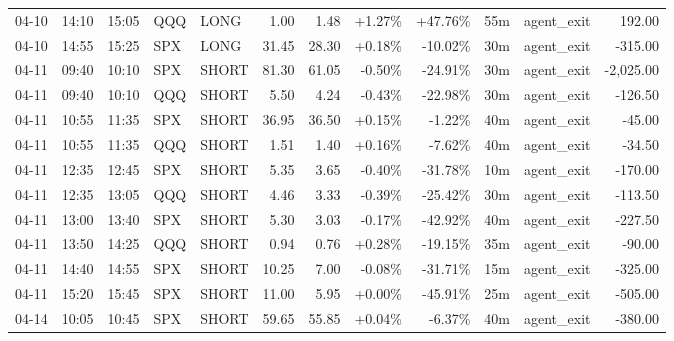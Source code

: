 \documentclass[11pt,a4paper,twoside]{article}
\begin{document}
\begin{center}
\begin{longtable}{>{\color{txtmain}}l l l l l r r r r r >{\color{txtmain}}l r}
04-10 & 14:10 & 15:05 & QQQ & LONG & 1.00 & 1.48 & \textcolor{wingreen}{+1.27\%} & \textcolor{wingreen}{+47.76\%} & 55m & agent\_exit & \textcolor{wingreen}{192.00} \\
04-10 & 14:55 & 15:25 & SPX & LONG & 31.45 & 28.30 & \textcolor{wingreen}{+0.18\%} & \textcolor{lossred}{-10.02\%} & 30m & agent\_exit & \textcolor{lossred}{-315.00} \\
04-11 & 09:40 & 10:10 & SPX & SHORT & 81.30 & 61.05 & \textcolor{lossred}{-0.50\%} & \textcolor{lossred}{-24.91\%} & 30m & agent\_exit & \textcolor{lossred}{-2,025.00} \\
04-11 & 09:40 & 10:10 & QQQ & SHORT & 5.50 & 4.24 & \textcolor{lossred}{-0.43\%} & \textcolor{lossred}{-22.98\%} & 30m & agent\_exit & \textcolor{lossred}{-126.50} \\
04-11 & 10:55 & 11:35 & SPX & SHORT & 36.95 & 36.50 & \textcolor{wingreen}{+0.15\%} & \textcolor{lossred}{-1.22\%} & 40m & agent\_exit & \textcolor{lossred}{-45.00} \\
04-11 & 10:55 & 11:35 & QQQ & SHORT & 1.51 & 1.40 & \textcolor{wingreen}{+0.16\%} & \textcolor{lossred}{-7.62\%} & 40m & agent\_exit & \textcolor{lossred}{-34.50} \\
04-11 & 12:35 & 12:45 & SPX & SHORT & 5.35 & 3.65 & \textcolor{lossred}{-0.40\%} & \textcolor{lossred}{-31.78\%} & 10m & agent\_exit & \textcolor{lossred}{-170.00} \\
04-11 & 12:35 & 13:05 & QQQ & SHORT & 4.46 & 3.33 & \textcolor{lossred}{-0.39\%} & \textcolor{lossred}{-25.42\%} & 30m & agent\_exit & \textcolor{lossred}{-113.50} \\
04-11 & 13:00 & 13:40 & SPX & SHORT & 5.30 & 3.03 & \textcolor{lossred}{-0.17\%} & \textcolor{lossred}{-42.92\%} & 40m & agent\_exit & \textcolor{lossred}{-227.50} \\
04-11 & 13:50 & 14:25 & QQQ & SHORT & 0.94 & 0.76 & \textcolor{wingreen}{+0.28\%} & \textcolor{lossred}{-19.15\%} & 35m & agent\_exit & \textcolor{lossred}{-90.00} \\
04-11 & 14:40 & 14:55 & SPX & SHORT & 10.25 & 7.00 & \textcolor{lossred}{-0.08\%} & \textcolor{lossred}{-31.71\%} & 15m & agent\_exit & \textcolor{lossred}{-325.00} \\
04-11 & 15:20 & 15:45 & SPX & SHORT & 11.00 & 5.95 & \textcolor{wingreen}{+0.00\%} & \textcolor{lossred}{-45.91\%} & 25m & agent\_exit & \textcolor{lossred}{-505.00} \\
04-14 & 10:05 & 10:45 & SPX & SHORT & 59.65 & 55.85 & \textcolor{wingreen}{+0.04\%} & \textcolor{lossred}{-6.37\%} & 40m & agent\_exit & \textcolor{lossred}{-380.00} \\

\end{longtable}
\end{center}
\end{document}
